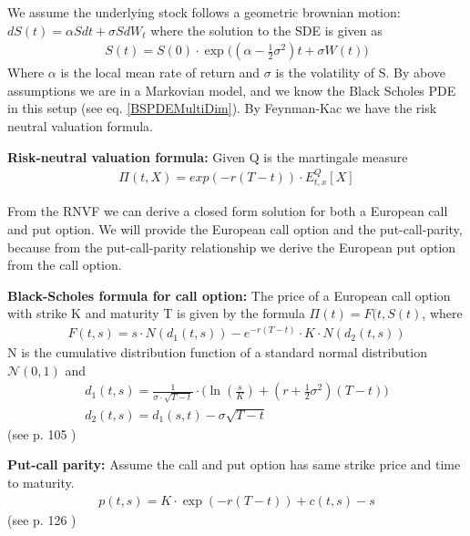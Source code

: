 We assume the underlying stock follows a geometric brownian motion:
$dS(t)=\alpha S dt + \sigma S dW_t$ where the solution to the SDE is given as
\begin{equation}\label{GBM}
\begin{split}
S(t)=S(0) \cdot \exp \bigg( (\alpha -\frac{1}{2} \sigma^2) t + \sigma W(t) \bigg)
\end{split}
\end{equation}
Where $\alpha$ is the local mean rate of return and $\sigma$ is the volatility of S. By above assumptions we are in a Markovian model, and we know the Black Scholes PDE in this setup (see eq.  \ref{BSPDEMultiDim}). By Feynman-Kac we have the risk neutral valuation formula.

\begin{theorem}\label{BRNVF}
\textbf{Risk-neutral valuation formula:} Given Q is the martingale measure
\begin{align}
\Pi(t, X)= exp(-r(T-t))\cdot E_{t,x}^Q[X]
\end{align}
\end{theorem}
From the RNVF we can derive a closed form solution for both a European call and put option. We will provide the European call option and the put-call-parity, because from the put-call-parity relationship we derive the European put option from the call option.

\theoremstyle{proposition}
\begin{proposition}{}\label{BS-price-EuroCall}
\textbf{Black-Scholes formula for call option:} The price of a European call option with strike K and maturity T is given by the formula  $\Pi(t)=F(t,S(t)$, where
\begin{align*}
F(t,s)=s \cdot N(d_1(t,s)) - e^{-r(T-t)}\cdot K \cdot N(d_2(t,s))
\end{align*}
N is the cumulative distribution function of a standard normal distribution $\mathcal{N}(0,1)$ and
\begin{align*}
d_1(t,s)=\frac{1}{\sigma\cdot \sqrt{T-t}} \cdot \bigg( \ln(\frac{s}{K}) + (r+\frac{1}{2} \sigma^2) (T-t) \bigg)\\
d_2(t,s)=d_1(s,t)-\sigma \sqrt{T-t}
\end{align*}
(see p. 105 \parencite{finKont})
\end{proposition}

\theoremstyle{proposition}
\begin{proposition}{}\label{put-call-parity}
\textbf{Put-call parity:} 
Assume the call and put option has same strike price and time to maturity.
\begin{align*}
p(t,s)=K\cdot \exp(-r(T-t))+c(t,s)-s
\end{align*}
(see p. 126 \parencite{finKont})
\end{proposition}

